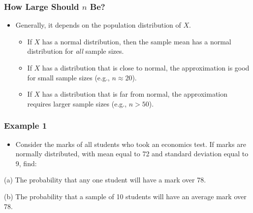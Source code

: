 \documentclass[12pt]{beamer}
\begin{document}
\begin{frame}
	\frametitle{How Large Should $n$ Be?}
	
	\begin{itemize}[label={\color{blue}$\blacktriangleright$}]
		\item Generally, it depends on the population distribution of $X$.
		\begin{itemize}[label={\color{blue}$\blacktriangleright$}]
			\item If $X$ has a normal distribution, then the sample mean has a normal distribution for \textit{all} sample sizes.
			\item If $X$ has a distribution that is close to normal, the approximation is good for small sample sizes (e.g., $n \approx 20$).
			\item If $X$ has a distribution that is far from normal, the approximation requires larger sample sizes (e.g., $n > 50$).
		\end{itemize}
	\end{itemize}
	
\end{frame}

\begin{frame}
	\frametitle{Example 1}
	
	\begin{itemize}[label={\color{blue}$\blacktriangleright$}]
		\item Consider the marks of all students who took an economics test. If marks are normally distributed, with mean equal to 72 and standard deviation equal to 9, find:
			\end{itemize}
		
		(a) The probability that any one student will have a mark over 78.
		
		(b) The probability that a sample of 10 students will have an average mark over 78.

	
\end{frame}
\end{document}
